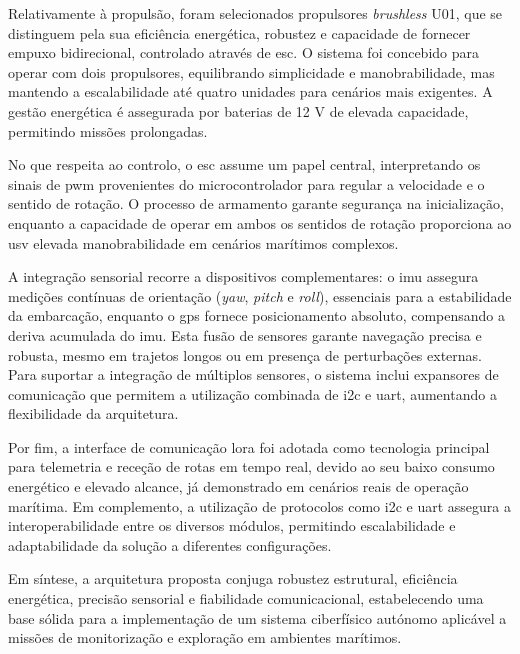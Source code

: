 Relativamente à propulsão, foram selecionados propulsores \emph{brushless} U01, que se distinguem pela sua eficiência energética, robustez e capacidade de fornecer empuxo bidirecional, controlado através de \gls{esc}. O sistema foi concebido para operar com dois propulsores, equilibrando simplicidade e manobrabilidade, mas mantendo a escalabilidade até quatro unidades para cenários mais exigentes. A gestão energética é assegurada por baterias de 12 V de elevada capacidade, permitindo missões prolongadas.

No que respeita ao controlo, o \gls{esc} assume um papel central, interpretando os sinais de \gls{pwm} provenientes do microcontrolador para regular a velocidade e o sentido de rotação. O processo de armamento garante segurança na inicialização, enquanto a capacidade de operar em ambos os sentidos de rotação proporciona ao \gls{usv} elevada manobrabilidade em cenários marítimos complexos.

A integração sensorial recorre a dispositivos complementares: o \gls{imu} assegura medições contínuas de orientação (\emph{yaw}, \emph{pitch} e \emph{roll}), essenciais para a estabilidade da embarcação, enquanto o \gls{gps} fornece posicionamento absoluto, compensando a deriva acumulada do \gls{imu}. Esta fusão de sensores garante navegação precisa e robusta, mesmo em trajetos longos ou em presença de perturbações externas. Para suportar a integração de múltiplos sensores, o sistema inclui expansores de comunicação que permitem a utilização combinada de \gls{i2c} e \gls{uart}, aumentando a flexibilidade da arquitetura.

Por fim, a interface de comunicação \gls{lora} foi adotada como tecnologia principal para telemetria e receção de rotas em tempo real, devido ao seu baixo consumo energético e elevado alcance, já demonstrado em cenários reais de operação marítima. Em complemento, a utilização de protocolos como \gls{i2c} e \gls{uart} assegura a interoperabilidade entre os diversos módulos, permitindo escalabilidade e adaptabilidade da solução a diferentes configurações.

Em síntese, a arquitetura proposta conjuga robustez estrutural, eficiência energética, precisão sensorial e fiabilidade comunicacional, estabelecendo uma base sólida para a implementação de um sistema ciberfísico autónomo aplicável a missões de monitorização e exploração em ambientes marítimos.
